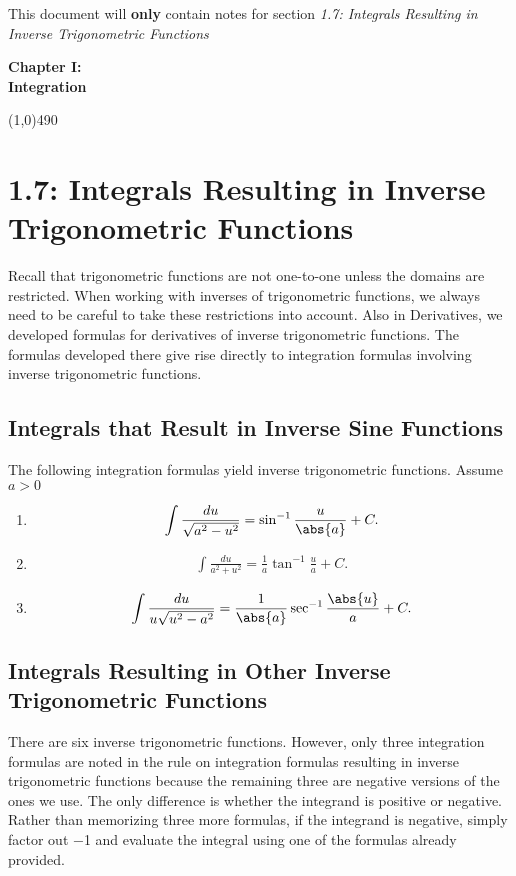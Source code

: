 \documentclass{report}
\begin{document}
    \bigbreak \noindent 
    This document will \textbf{only} contain notes for section \textit{1.7: Integrals Resulting in Inverse Trigonometric Functions}
    \pagebreak \bigbreak \noindent 
    \vspace{2in} \\
    \begin{Huge}
      \textbf{Chapter I: \\ Integration}  
    \end{Huge}
    \bigbreak \noindent 
    \line(1,0){490}
    \bigbreak \noindent 
    \section*{\LARGE 1.7: Integrals Resulting in Inverse Trigonometric Functions}
    \bigbreak \noindent 
    Recall that trigonometric functions are not one-to-one unless the domains are restricted. When working with inverses of trigonometric functions, we always need to be careful to take these restrictions into account. Also in Derivatives, we developed formulas for derivatives of inverse trigonometric functions. The formulas developed there give rise directly to integration formulas involving inverse trigonometric functions.
    \bigbreak \noindent 
    \subsection{Integrals that Result in Inverse Sine Functions}
    \bigbreak \noindent 
    The following integration formulas yield inverse trigonometric functions. Assume  $a>0$
    \begin{enumerate}
        \item \begin{align*}
                \int \frac{du}{\sqrt{a^{2}-u^{2}}} = \sin^{-1}{\frac{u}{\abs{a}}} + C
        .\end{align*}
    \item \begin{align*}
        \int \frac{du}{a^{2}+u^{2}} = \frac{1}{a}\tan^{-1}{\frac{u}{a}} + C
    .\end{align*}
    \item \begin{align*}
            \int \frac{du}{u\sqrt{u^{2}-a^{2}}} = \frac{1}{\abs{a}}\sec^{-1}{\frac{\abs{u}}{a}} + C
    .\end{align*}
    \end{enumerate}
    \bigbreak \noindent 
    \subsection{Integrals Resulting in Other Inverse Trigonometric Functions}
    \bigbreak \noindent 
    There are six inverse trigonometric functions. However, only three integration formulas are noted in the rule on integration formulas resulting in inverse trigonometric functions because the remaining three are negative versions of the ones we use. The only difference is whether the integrand is positive or negative. Rather than memorizing three more formulas, if the integrand is negative, simply factor out −1 and evaluate the integral using one of the formulas already provided. 
\end{document}
